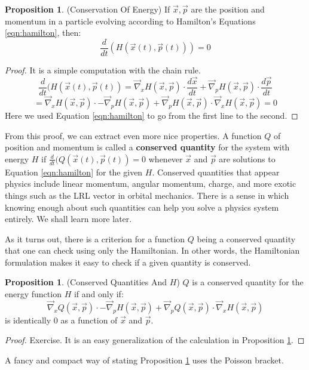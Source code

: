 \documentclass[12pt]{article}
\theoremstyle{definition}
\newtheorem{proposition}[theorem]{Proposition}
\numberwithin{equation}{section}
\begin{document}
\begin{proposition} \label{prop:conservation_of_energy} (Conservation Of Energy) If $\vec{x},\vec{p}$ are the position and momentum in a particle evolving according to Hamilton's Equations \ref{eqn:hamilton}, then:
\[
\frac{d}{dt}(H(\vec{x}(t),\vec{p}(t))) = 0
\]
\end{proposition}

\begin{proof} It is a simple computation with the chain rule.
\[
\frac{d}{dt}(H(\vec{x}(t),\vec{p}(t)) = \vec{\nabla}_x H(\vec{x},\vec{p}) \cdot \frac{d\vec{x}}{dt} + \vec{\nabla}_p H(\vec{x},\vec{p}) \cdot \frac{d\vec{p}}{dt}
\]
\[
= \vec{\nabla}_x H(\vec{x},\vec{p}) \cdot -\vec{\nabla}_p H(\vec{x},\vec{p}) + \vec{\nabla}_p H(\vec{x},\vec{p}) \cdot \vec{\nabla}_x H(\vec{x},\vec{p}) = 0
\]
Here we used Equation \ref{eqn:hamilton} to go from the first line to the second.\end{proof}

From this proof, we can extract even more nice properties. A function $Q$ of position and momentum is called a {\bf conserved quantity} for the system with energy $H$ if $\frac{d}{dt}(Q(\vec{x}(t),\vec{p}(t)) = 0$ whenever $\vec{x}$ and $\vec{p}$ are solutions to Equation \ref{eqn:hamilton} for the given $H$. Conserved quantities that appear physics include linear momentum, angular momentum, charge, and more exotic things such as the LRL vector in orbital mechanics. There is a sense in which knowing enough about such quantities can help you solve a physics system entirely. We shall learn more later.

As it turns out, there is a criterion for a function $Q$ being a conserved quantity that one can check using only the Hamiltonian. In other words, the Hamiltonian formulation makes it easy to check if a  given quantity is conserved.

\begin{proposition} \label{prop:conservation_of_stuff} (Conserved Quantities And $H$) $Q$ is a conserved quantity for the energy function $H$ if and only if:
\begin{equation} \label{eqn:poisson_bracket_unnamed}
\vec{\nabla}_x Q(\vec{x},\vec{p}) \cdot -\vec{\nabla}_p H(\vec{x},\vec{p}) + \vec{\nabla}_p Q(\vec{x},\vec{p}) \cdot \vec{\nabla}_x H(\vec{x},\vec{p})
\end{equation}
is identically $0$ as a function of $\vec{x}$ and $\vec{p}$.
\end{proposition}

\begin{proof} Exercise. It is an easy generalization of the calculation in Proposition \ref{prop:conservation_of_energy}. \end{proof}
A fancy and compact way of stating Proposition \ref{prop:conservation_of_stuff} uses the Poisson bracket.
\end{document}
